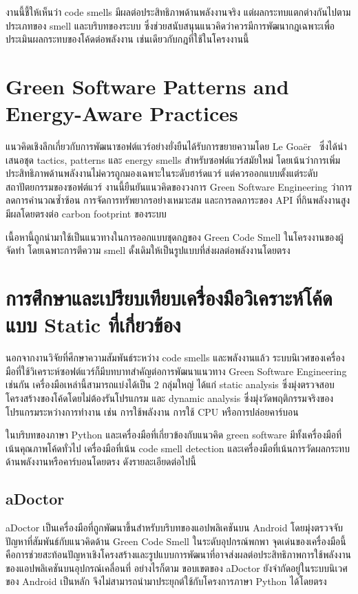 งานนี้ชี้ให้เห็นว่า code smells มีผลต่อประสิทธิภาพด้านพลังงานจริง แต่ผลกระทบแตกต่างกันไปตามประเภทของ smell และบริบทของระบบ ซึ่งช่วยสนับสนุนแนวคิดว่าควรมีการพัฒนากฎเฉพาะเพื่อประเมินผลกระทบของโค้ดต่อพลังงาน เช่นเดียวกับกฎที่ใช้ในโครงงานนี้


\section{Green Software Patterns and Energy-Aware Practices}
แนวคิดเชิงลึกเกี่ยวกับการพัฒนาซอฟต์แวร์อย่างยั่งยืนได้รับการขยายความโดย Le Goaër~\cite{leGoaer2024tactics} ซึ่งได้นำเสนอชุด tactics, patterns และ energy smells สำหรับซอฟต์แวร์สมัยใหม่ โดยเน้นว่าการเพิ่มประสิทธิภาพด้านพลังงานไม่ควรถูกมองเฉพาะในระดับฮาร์ดแวร์ แต่ควรออกแบบตั้งแต่ระดับสถาปัตยกรรมของซอฟต์แวร์ งานนี้ยืนยันแนวคิดของวงการ Green Software Engineering ว่าการลดการคำนวณซ้ำซ้อน การจัดการทรัพยากรอย่างเหมาะสม และการลดภาระของ API ที่กินพลังงานสูง มีผลโดยตรงต่อ carbon footprint ของระบบ

เนื้อหานี้ถูกนำมาใช้เป็นแนวทางในการออกแบบชุดกฎของ Green Code Smell ในโครงงานของผู้จัดทำ โดยเฉพาะการตีความ smell ดั้งเดิมให้เป็นรูปแบบที่ส่งผลต่อพลังงานโดยตรง


\section{การศึกษาและเปรียบเทียบเครื่องมือวิเคราะห์โค้ดแบบ Static ที่เกี่ยวข้อง}
นอกจากงานวิจัยที่ศึกษาความสัมพันธ์ระหว่าง {\italicfont code smells} และพลังงานแล้ว ระบบนิเวศของเครื่องมือที่ใช้วิเคราะห์ซอฟต์แวร์ก็มีบทบาทสำคัญต่อการพัฒนาแนวทาง {\italicfont Green Software Engineering} เช่นกัน เครื่องมือเหล่านี้สามารถแบ่งได้เป็น 2 กลุ่มใหญ่ ได้แก่ {\italicfont static analysis} ซึ่งมุ่งตรวจสอบโครงสร้างของโค้ดโดยไม่ต้องรันโปรแกรม และ {\italicfont dynamic analysis} ซึ่งมุ่งวัดพฤติกรรมจริงของโปรแกรมระหว่างการทำงาน เช่น การใช้พลังงาน การใช้ CPU หรือการปล่อยคาร์บอน

ในบริบทของภาษา Python และเครื่องมือที่เกี่ยวข้องกับแนวคิด {\italicfont green software} มีทั้งเครื่องมือที่เน้นคุณภาพโค้ดทั่วไป เครื่องมือที่เน้น {\italicfont code smell detection} และเครื่องมือที่เน้นการวัดผลกระทบด้านพลังงานหรือคาร์บอนโดยตรง ดังรายละเอียดต่อไปนี้

\subsection{aDoctor}
{\boldfont aDoctor} เป็นเครื่องมือที่ถูกพัฒนาขึ้นสำหรับบริบทของแอปพลิเคชันบน Android โดยมุ่งตรวจจับปัญหาที่สัมพันธ์กับแนวคิดด้าน {\italicfont Green Code Smell} ในระดับอุปกรณ์พกพา จุดเด่นของเครื่องมือนี้คือการช่วยสะท้อนปัญหาเชิงโครงสร้างและรูปแบบการพัฒนาที่อาจส่งผลต่อประสิทธิภาพการใช้พลังงานของแอปพลิเคชันบนอุปกรณ์เคลื่อนที่ อย่างไรก็ตาม ขอบเขตของ aDoctor ยังจำกัดอยู่ในระบบนิเวศของ Android เป็นหลัก จึงไม่สามารถนำมาประยุกต์ใช้กับโครงการภาษา Python ได้โดยตรง


